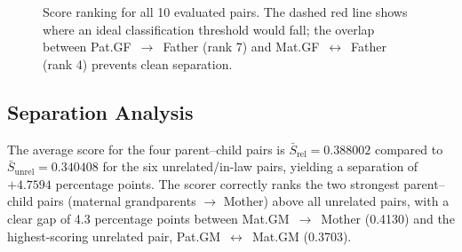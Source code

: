 \documentclass{../yalumba}
\begin{document}
\begin{figure}[htbp]
\caption{Score ranking for all 10 evaluated pairs.  The dashed red line
  shows where an ideal classification threshold would fall; the overlap
  between Pat.GF~$\to$~Father (rank 7) and Mat.GF~$\leftrightarrow$~Father
  (rank 4) prevents clean separation.}
\label{fig:ranking}
\end{figure}

\subsection{Separation Analysis}

\begin{keyfinding}
The average score for the four parent--child pairs is
$\bar{S}_{\text{rel}} = 0.388002$ compared to
$\bar{S}_{\text{unrel}} = 0.340408$ for the six unrelated/in-law pairs,
yielding a separation of $+4.7594$ percentage points.
The scorer correctly ranks the two strongest parent--child pairs
(maternal grandparents $\to$ Mother) above all unrelated pairs, with a clear
gap of 4.3 percentage points between Mat.GM~$\to$~Mother (0.4130) and the
highest-scoring unrelated pair, Pat.GM~$\leftrightarrow$~Mat.GM (0.3703).
\end{keyfinding}
\end{document}
